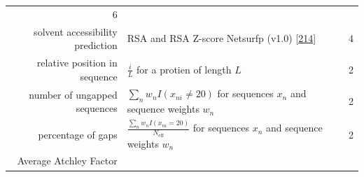 \documentclass[11pt,a4paper,twoside]{book}
\theoremstyle{definition}
\theoremstyle{definition}
\theoremstyle{remark}
\begin{document}
\begin{longtable}[]{@{}rlc@{}}
\begin{minipage}[t]{0.18\columnwidth}
6\strut
\end{minipage}\tabularnewline
\begin{minipage}[t]{0.23\columnwidth}\raggedleft\strut
solvent accessibility prediction\strut
\end{minipage} & \begin{minipage}[t]{0.50\columnwidth}\raggedright\strut
RSA and RSA Z-score Netsurfp (v1.0)
{[}\protect\hyperlink{ref-Petersen2009a}{214}{]}\strut
\end{minipage} & \begin{minipage}[t]{0.18\columnwidth}\centering\strut
4\strut
\end{minipage}\tabularnewline
\begin{minipage}[t]{0.23\columnwidth}\raggedleft\strut
relative position in sequence\strut
\end{minipage} & \begin{minipage}[t]{0.50\columnwidth}\raggedright\strut
\(\frac{i}{L}\) for a protien of length \(L\)\strut
\end{minipage} & \begin{minipage}[t]{0.18\columnwidth}\centering\strut
2\strut
\end{minipage}\tabularnewline
\begin{minipage}[t]{0.23\columnwidth}\raggedleft\strut
number of ungapped sequences\strut
\end{minipage} & \begin{minipage}[t]{0.50\columnwidth}\raggedright\strut
\(\sum_n w_n I(x_{ni} \neq 20)\) for sequences \(x_n\) and sequence
weights \(w_n\)\strut
\end{minipage} & \begin{minipage}[t]{0.18\columnwidth}\centering\strut
2\strut
\end{minipage}\tabularnewline
\begin{minipage}[t]{0.23\columnwidth}\raggedleft\strut
percentage of gaps\strut
\end{minipage} & \begin{minipage}[t]{0.50\columnwidth}\raggedright\strut
\(\frac{\sum_n w_n I(x_{ni} = 20)}{N_{\text{eff}}}\) for sequences
\(x_n\) and sequence weights \(w_n\)\strut
\end{minipage} & \begin{minipage}[t]{0.18\columnwidth}\centering\strut
2\strut
\end{minipage}\tabularnewline
\begin{minipage}[t]{0.23\columnwidth}\raggedleft\strut
Average Atchley Factor\strut
\end{minipage} & \begin{minipage}[t]{0.50\columnwidth}\raggedright\strut

\end{minipage}
\end{longtable}
\end{document}
